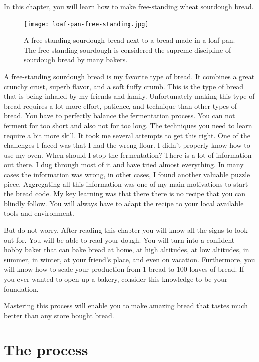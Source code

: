 In this chapter, you will learn how to make
free-standing wheat sourdough bread.

\begin{figure}[!htb]
  \texttt{[image: loaf-pan-free-standing.jpg]}
  \caption{A free-standing sourdough bread next to a bread made in a loaf pan.
  The free-standing sourdough is considered the supreme discipline of sourdough bread by many bakers.
  }
\end{figure}

A free-standing sourdough bread is my favorite
type of bread. It combines a great crunchy crust, superb
flavor, and a soft fluffy crumb. This is the type of bread
that is being inhaled by my friends and family. Unfortunately
making this type of bread requires a lot more effort, patience,
and technique than other types of bread. You have to perfectly
balance the fermentation process. You can not ferment for too
short and also not for too long. The techniques you need to
learn require a bit more skill. It took me several attempts
to get this right. One of the challenges I faced was that
I had the wrong flour. I didn't properly know how to use my oven.
When should I stop the fermentation? There is a lot of information
out there. I dug through most of it and have tried almost everything.
In many cases the information was wrong, in other cases, I
found another valuable puzzle piece. Aggregating all this
information was one of my main motivations to start the bread code.
My key learning was that there there is no recipe that
you can blindly follow. You will always have to adapt the recipe
to your local available tools and environment. 

But do not worry. After reading this chapter you will know
all the signs to look out for. You will be able to read your dough.
You will turn into a confident hobby baker that can bake bread
at home, at high altitudes, at low altitudes, in summer, in winter,
at your friend's place, and even on vacation. Furthermore,
you will know how to scale your production from 1 bread to 100 loaves of bread.
If you ever wanted to open up a bakery, consider this knowledge to
be your foundation.

Mastering this process will enable you to make amazing bread
that tastes much better than any store bought bread.

\section{The process}

